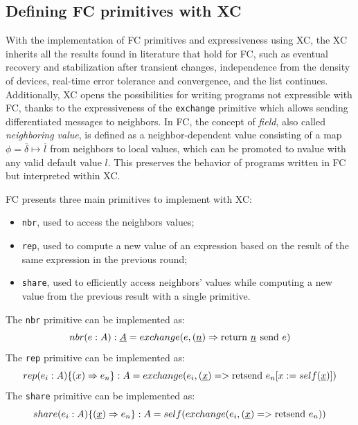 \subsection{Defining FC primitives with XC}

With the implementation of \ac{FC} primitives and expressiveness using \ac{XC}, the \ac{XC} inherits all the results found in literature that hold for \ac{FC}, such as eventual recovery and stabilization after transient changes\cite{self-stabilisation-in-fc}, independence from the density of devices\cite{density-independence-in-fc}, real-time error tolerance and convergence\cite{real-time-error-tolerance-in-fc}, and the list continues\cite{xc}.
%
Additionally, \ac{XC} opens the possibilities for writing programs not expressible with \ac{FC}, thanks to the expressiveness of the \texttt{exchange} primitive which allows sending differentiated messages to neighbors.
%
In \ac{FC}, the concept of \textit{field}, also called \textit{neighboring value}, is defined as a neighbor-dependent value consisting of a map $\phi = \overline{\delta} \mapsto \overline{l}$ from neighbors to local values, which can be promoted to nvalue with any valid default value $l$.
%
This preserves the behavior of programs written in \ac{FC} but interpreted within \ac{XC}\cite{xc}.

\ac{FC} presents three main primitives to implement with \ac{XC}:
\begin{itemize}
    \item \texttt{nbr}, used to access the neighbors values\cite{from-dc-to-fc-and-ap};
    \item \texttt{rep}, used to compute a new value of an expression based on the result of the same expression in the previous round\cite{from-dc-to-fc-and-ap};
    \item \texttt{share}, used to efficiently access neighbors' values while computing a new value from the previous result with a single primitive\cite{share-operator}.
\end{itemize}

The \texttt{nbr} primitive can be implemented as: $$nbr(e: A): \underline{A} = exchange(e, (\underline{n}) \Rightarrow \operatorname{return\,} \underline{n} \operatorname{\:send\,} e)$$
%
The \texttt{rep} primitive can be implemented as: $$rep(e_i: A)\{(x) \Rightarrow e_n\}: A = exchange(e_i, (\underline{x}) => \operatorname{retsend\,} e_n[x := self(\underline{x})])$$
%
The \texttt{share} primitive can be implemented as: $$share(e_i: A)\{(\underline{x}) \Rightarrow e_n\}: A = self(exchange(e_i, (\underline{x}) => \operatorname{retsend\,} e_n))$$

